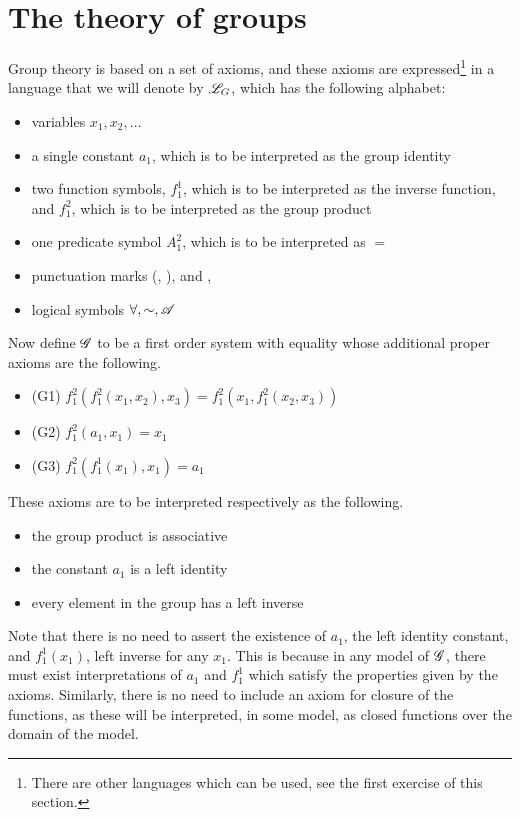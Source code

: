 \section{The theory of groups}
Group theory is based on a set of axioms, and these axioms are expressed\footnote{There are other languages which can be used, see the first exercise of this section.} in a language that we will denote by \(\mathscr{L}_G\), which has the following alphabet:
\begin{itemize}
  \item variables \(x_1, x_2, \dots\)
  \item a single constant \(a_1\), which is to be interpreted as the group identity
  \item two function symbols, \(f^1_1\), which is to be interpreted as the inverse function, and \(f^2_1\), which is to be interpreted as the group product
  \item one predicate symbol \(A^2_1\), which is to be interpreted as \(=\)
  \item punctuation marks (, ), and ,
  \item logical symbols \(\forall, \sim, \mathscr{A}\)
\end{itemize}

Now define \(\mathscr{G}\) to be a first order system with equality whose additional proper axioms are the following.
\begin{itemize}
  \item (G1) \(f^2_1(f^2_1(x_1, x_2), x_3) = f^2_1(x_1, f^2_1(x_2, x_3))\)
  \item (G2) \(f^2_1(a_1, x_1) = x_1\)
  \item (G3) \(f^2_1(f^1_1(x_1), x_1) = a_1\)
\end{itemize}
These axioms are to be interpreted respectively as the following.
\begin{itemize}
  \item the group product is associative
  \item the constant \(a_1\) is a left identity
  \item every element in the group has a left inverse
\end{itemize}
Note that there is no need to assert the existence of \(a_1\), the left identity constant, and \(f^1_1(x_1)\), left inverse for any \(x_1\). This is because in any model of \(\mathscr{G}\), there must exist interpretations of \(a_1\) and \(f^1_1\) which satisfy the properties given by the axioms. Similarly, there is no need to include an axiom for closure of the functions, as these will be interpreted, in some model, as closed functions over the domain of the model.

